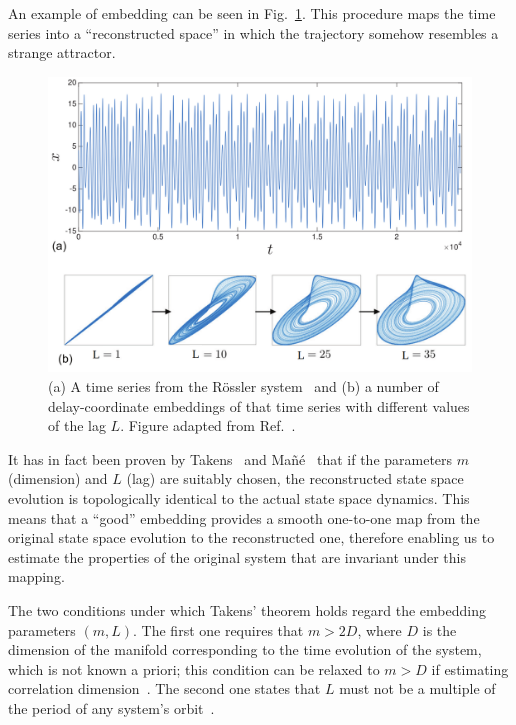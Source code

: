 An example of embedding can be seen in Fig.~\ref{fig: rossler embedding}.
This procedure maps the time series into a ``reconstructed space'' in which the trajectory
somehow resembles a strange attractor.

\begin{figure}[!htbp]
    \centering
    \includegraphics[width=\linewidth]{images/rossler_embedding.png}
    \caption{
    (a) A time series from the R{\"o}ssler system~\cite{rossler1977continuous}
    and (b) a number of delay-coordinate embeddings of that time series with different values of the lag $L$.
    Figure adapted from Ref.~\cite{ref:bradley2015nonlinear}.}\label{fig: rossler embedding}
\end{figure}

It has in fact been proven by Takens~\cite{ref:takens2006detecting} and Ma{\~n}{\'e}~\cite{ref:mane2006dimension} that
if the parameters $m$ (dimension) and $L$ (lag) are suitably chosen,
the reconstructed state space evolution is topologically identical to the actual state space dynamics.
This means that a ``good'' embedding provides a smooth one-to-one map from the
original state space evolution to the reconstructed one, therefore enabling us to estimate the
properties of the original system that are invariant under this mapping.

The two conditions under which Takens' theorem holds regard the embedding parameters $(m,L)$.
The first one requires that $m>2D$, where $D$ is the dimension of the manifold corresponding to the
time evolution of the system, which is not known a priori; this condition can be relaxed to $m>D$ if
estimating correlation dimension~\cite{ref:ding1993estimating}.
The second one states that $L$ must not be a multiple of the period of any system's
orbit~\cite{ref:grassberger1991nonlinear}.

